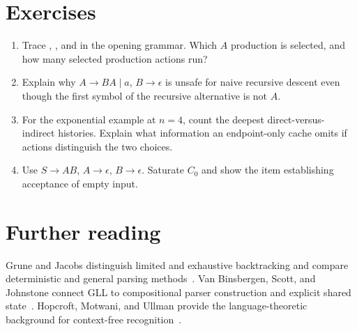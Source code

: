 \section{Exercises}
\label{sec:ch51-exercises}
\begin{enumerate}
\item\label{ex:ch51-three-inputs} Trace , , and  in the opening grammar. Which $A$ production is selected, and how many selected production actions run?
\item\label{ex:ch51-null-cycle} Explain why $A\to B A\mid a$, $B\to\epsilon$ is unsafe for naive recursive descent even though the first symbol of the recursive alternative is not $A$.
\item\label{ex:ch51-sharing} For the exponential example at $n=4$, count the deepest direct-versus-indirect histories. Explain what information an endpoint-only cache omits if actions distinguish the two choices.
\item\label{ex:ch51-null-chart} Use $S\to AB$, $A\to\epsilon$, $B\to\epsilon$. Saturate $C_0$ and show the item establishing acceptance of empty input.
\end{enumerate}

\section{Further reading}
\label{sec:ch51-reading}
Grune and Jacobs distinguish limited and exhaustive backtracking and compare deterministic and general parsing methods~\cite{grune-2008-parsing}.
Van Binsbergen, Scott, and Johnstone connect GLL to compositional parser construction and explicit shared state~\cite{vanbinsbergen-2018-gll}.
Hopcroft, Motwani, and Ullman provide the language-theoretic background for context-free recognition~\cite{hopcroft-2007-automata}.
